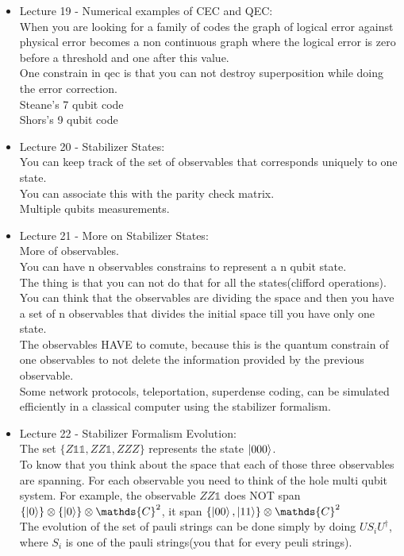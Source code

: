 \documentclass{article}
\begin{document}
\begin{itemize}
    \item {Lecture 19 - Numerical examples of CEC and QEC:}\\
    When you are looking for a family of codes the graph of logical error against physical error becomes a non continuous graph where the logical error is zero before a threshold and one after this value.\\
    One constrain in qec is that you can not destroy superposition while doing the error correction.\\
    Steane's 7 qubit code\\
    Shors's 9 qubit code\\

    \item {Lecture 20 - Stabilizer States:}\\
    You can keep track of the set of observables that corresponds uniquely to one state.\\
    You can associate this with the parity check matrix.\\
    Multiple qubits measurements.\\

    \item {Lecture 21 - More on Stabilizer States:}\\
    More of observables.\\
    You can have n observables constrains to represent a n qubit state.\\
    The thing is that you can not do that for all the states(clifford operations).\\
    You can think that the observables are dividing the space and then you have a set of n observables that divides the initial space till you have only one state.\\
    The observables HAVE to comute, because this is the quantum constrain of one observables to not delete the information provided by the previous observable.\\
    Some network protocols, teleportation, superdense coding, can be simulated efficiently in a classical computer using the stabilizer formalism.\\

    \item {Lecture 22 - Stabilizer Formalism Evolution:}\\
    The set $\{ Z\mathds{1}\mathds{1}, ZZ\mathds{1}, ZZZ\} $ represents the state $\ket{000}$.\\
    To know that you think about the space that each of those three observables are spanning. For each observable you need to think of the hole multi qubit system. For example, the observable $ZZ\mathds{1}$ does NOT span $\{\ket{0}\} \otimes \{\ket{0}\} \otimes \mathds{C}^{2}$, it span $\{\ket{00}, \ket{11}\} \otimes \mathds{C}^{2} $ \\
    The evolution of the set of pauli strings can be done simply by doing $US_iU^{\dag}$, where $S_i$ is one of the pauli strings(you that for every peuli strings).\\


\end{itemize}
\end{document}
